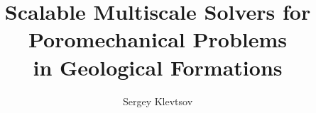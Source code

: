 \documentclass{report}
\title{Scalable Multiscale Solvers for Poromechanical Problems\\
in Geological Formations}
\author{Sergey Klevtsov}
\begin{document}
 
\beforepreface





\afterpreface











\appendix



\end{document}

